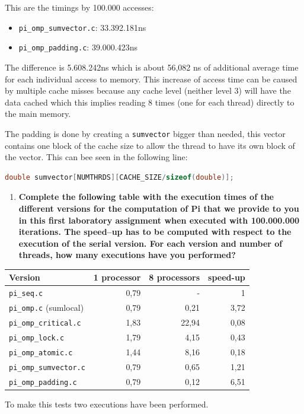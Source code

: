\documentclass[a4paper]{article}
\begin{document}
This are the timings by 100.000 accesses:
\begin{itemize}
	\item \verb|pi_omp_sumvector.c|: 33.392.181ns
	\item \verb|pi_omp_padding.c|: 39.000.423ns
\end{itemize}

The difference is 5.608.242ns which is about 56,082 ns of additional average time for each individual access to memory. This increase of access time can be caused by multiple cache misses because any cache level (neither level 3) will have the data cached which this implies reading 8 times (one for each thread) directly to the main memory.

The padding is done by creating a \verb|sumvector| bigger than needed, this vector contains one block of the cache size to allow the thread to have its own block of the vector. This can bee seen in the following line:

\begin{lstlisting}[language=C]
double sumvector[NUMTHRDS][CACHE_SIZE/sizeof(double)];
\end{lstlisting}


\begin{enumerate}[resume]
	\item \textbf{ Complete the following table with the execution times of the different versions for the computation of Pi that we provide to you in this first laboratory assignment when executed with 100.000.000 iterations. The speed–up has to be computed with respect to the execution of the serial version. For each version and number of threads, how many executions have you performed? }
\end{enumerate}

\begin{table}[H]
	\centering
	\begin{tabular}{l|rrr}
		\textbf{Version} & \textbf{1 processor} & \textbf{8 processors} & \textbf{speed-up} \\
		\hline
		\verb|pi_seq.c| & 0,79  & - & 1 \\
		\verb|pi_omp.c| (sumlocal) & 0,79 & 0,21 & 3,72  \\
		\verb|pi_omp_critical.c| & 1,83 & 22,94 & 0,08  \\
		\verb|pi_omp_lock.c| & 1,79 & 4,15 & 0,43  \\
		\verb|pi_omp_atomic.c| & 1,44 & 8,16 & 0,18  \\
		\verb|pi_omp_sumvector.c| & 0,79 & 0,65 & 1,21  \\
		\verb|pi_omp_padding.c| & 0,79 & 0,12 & 6,51  \\
	\end{tabular}
\end{table}

To make this tests two executions have been performed.
\end{document}
